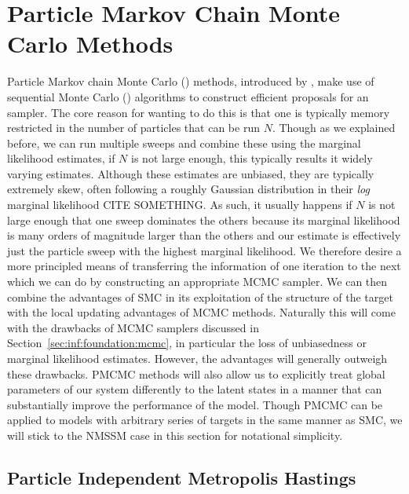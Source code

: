 
\section{Particle Markov Chain Monte Carlo Methods}
\label{sec:part:pmcmc}

Particle Markov chain Monte Carlo (\pmcmc) methods, introduced by \citet{andrieuDH2010}, make use of 
sequential Monte Carlo (\smc) algorithms \citep{gordon1993novel,doucet2001sequential} to construct 
efficient proposals for an \mcmc sampler. The core reason for wanting to do this is that
one is typically memory restricted in the number of particles that can be run $N$.  Though as we explained
before, we can run multiple sweeps and combine these using the marginal likelihood estimates, if $N$ is
not large enough, this typically results it widely varying estimates.  Although these estimates are unbiased,
they are typically extremely skew, often following a roughly Gaussian distribution in their \emph{log} marginal
likelihood CITE SOMETHING.  As such, it usually happens if $N$ is not large enough that one sweep dominates the others because
its marginal likelihood is many orders of magnitude larger than the others and our estimate is
effectively just the particle sweep with the highest marginal likelihood.  We therefore desire a more principled
means of transferring the information of one iteration to the next which we can do by constructing an appropriate MCMC
sampler.  We can then combine the advantages of SMC in its exploitation of the structure of the target with
the local updating advantages of MCMC methods.  Naturally this will come with the drawbacks of MCMC samplers
discussed in Section~\ref{sec:inf:foundation:mcmc}, in particular the loss of unbiasedness or marginal likelihood estimates.
However, the advantages will generally outweigh these drawbacks.  PMCMC methods will also allow us to explicitly
treat global parameters of our system differently to the latent states in a manner that can substantially improve
the performance of the model.
Though PMCMC can be applied to models with arbitrary series of targets in the same manner as SMC, we will stick
to the NMSSM case in this section for notational simplicity.

\subsection{Particle Independent Metropolis Hastings}
\label{sec:part:pmcmc:pimh}

